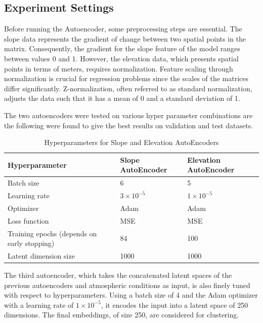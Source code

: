 \documentclass[a4paper,12pt]{Classes/RoboticsLaTeX}
\begin{document}
	\subsection{Experiment Settings}

	Before running the Autoencoder, some preprocessing steps are essential. The slope data represents the gradient of change between 
	two spatial points in the matrix. Consequently, the gradient for the slope feature of the model ranges between values 0 and 1. 
	However, the elevation data, which presents spatial points in terms of meters, requires normalization. Feature scaling through 
	normalization is crucial for regression problems since the scales of the matrices differ significantly. Z-normalization, often 
	referred to as standard normalization, adjusts the data such that it has a mean of 0 and a standard deviation of 1.
	
	The two autoencoders were tested on various hyper parameter combinations are the following were found to give the best
	results on validation and test datasets.

	\begin{table}[H]
		\centering
		\begin{tabularx}{1\textwidth}{|X|X|X|}
		\hline
		\textbf{Hyperparameter} & \textbf{Slope AutoEncoder} & \textbf{Elevation AutoEncoder} \\
		\hline
		Batch size & 6 & 5 \\
		\hline
		Learning rate & $3 \times 10^{-5}$ & $1 \times 10^{-5}$ \\
		\hline
		Optimizer & Adam & Adam \\
		\hline
		Loss function & \ac{MSE} & \ac{MSE} \\
		\hline
		Training epochs (depends on early stopping) & 84 & 100 \\
		\hline
		Latent dimension size & 1000 & 1000 \\
		\hline
		\end{tabularx}
		\caption{Hyperparameters for Slope and Elevation AutoEncoders}
		\end{table}
		
		The third autoencoder, which takes the concatenated latent spaces of the previous autoencoders and atmospheric conditions as input, is also finely tuned with respect to hyperparameters. Using a batch size of 4
		and the Adam optimizer with a learning rate of  $1 \times 10^{-5}$, it encodes the input into a latent space of 
		250 dimensions. The final embeddings, of size 250, are considered for clustering.
\end{document}
